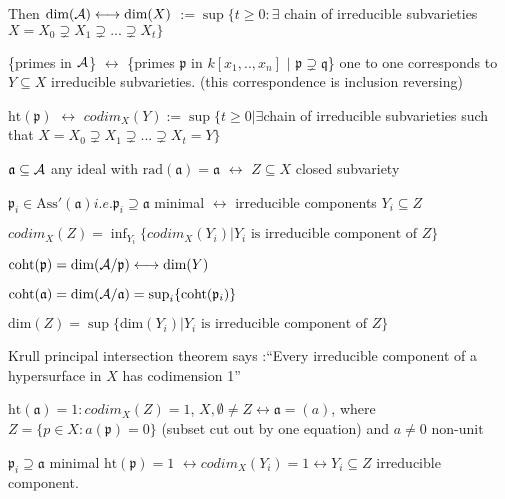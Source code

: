 \documentclass[11pt]{article}
\newcommand{\sca}{{\mathfrak a}}
\newcommand{\scp}{{\mathfrak p}}
\newcommand{\scq}{\mathfrak q}
\newcommand{\cala}{{\cal A}}
\newcommand{\llrta}{\longleftrightarrow}
\begin{document}
Then $\text{dim}(\cala)\llrta \text{dim}(X)$ $:=\sup\{t\geq 0:\exists$ chain of irreducible subvarieties $ X=X_0\supsetneq X_1\supsetneq ...\supsetneq X_t\}$

\{primes in $\cala$\} $\llrta$ \{primes $\scp$ in $k[x_1,..,x_n]$ $|$ $\scp\supsetneq \scq$\} one to one corresponds to $Y\subseteq X$ irreducible subvarieties. (this correspondence is inclusion reversing)

$\text{ht}(\scp)$ $\llrta$ $codim_X(Y):=\sup\{t\geq 0|\exists $chain of irreducible subvarieties such that $X=X_0\supsetneq X_1\supsetneq ...\supsetneq X_t=Y\}$

$\sca\subseteq\cala$ any ideal with $\text{rad}(\sca)=\sca $ $\llrta$ $Z\subseteq X$ closed subvariety

$\scp_i\in \text{Ass}'(\sca) i.e. \scp_i\supseteq \sca$ minimal $\llrta$ irreducible components $Y_i\subseteq Z$

$codim_X(Z)=\inf_{Y_i}\{ codim_X(Y_i)| \text{$Y_i$ is irreducible component of $Z$}\}$

$\text{coht}(\scp)=\text{dim}(\cala/\scp)\llrta \text{dim}(Y)$

$\text{coht}(\sca)=\text{dim}(\cala/\sca)=\sup_i \{\text{coht}(\scp_i)\}$

$\text{dim}(Z)=\sup\{ \text{dim}(Y_i)| Y_i\text{ is irreducible component of $Z$}\}$

Krull principal intersection theorem says :``Every irreducible component of a hypersurface in $X$ has codimension 1''

$\text{ht}(\sca)=1:codim_X(Z)=1$, $X,\emptyset\neq Z\llrta\sca=(a)$, where $Z=\{p\in X:a(\scp)=0\}$ (subset cut out by one equation) and $a\neq 0\text{ non-unit}$

$\scp_i\supseteq \sca$ minimal $\text{ht}(\scp)=1$ $\llrta codim_X(Y_i)=1\llrta Y_i\subseteq Z$ irreducible component.
\end{document}
